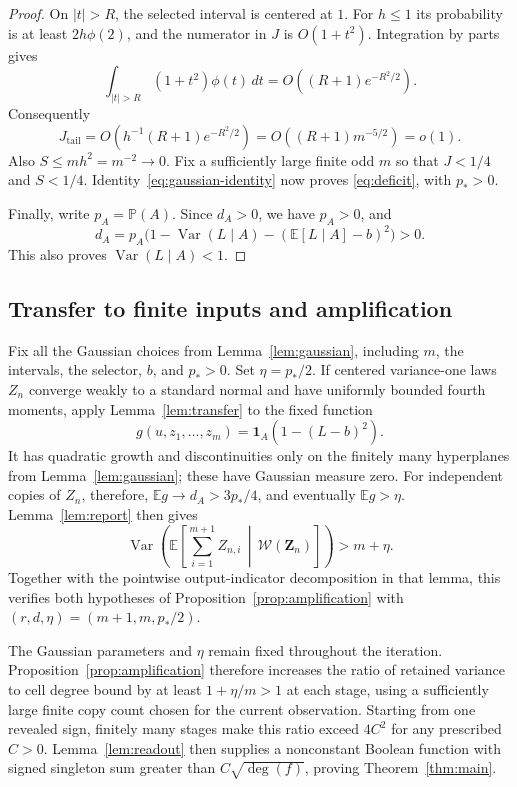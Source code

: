 \begin{proof}
On $|t|>R$, the selected interval is centered at $1$.  For $h\le1$
its probability is at least $2h\phi(2)$, and the numerator in $J$
is $O(1+t^2)$.  Integration by parts gives
\[
 \int_{|t|>R}(1+t^2)\phi(t)\,dt
       =O((R+1)e^{-R^2/2}).
\]
Consequently
\[
 J_{\mathrm{tail}}
 =O(h^{-1}(R+1)e^{-R^2/2})
 =O((R+1)m^{-5/2})=o(1).
\]
Also $S\le mh^2=m^{-2}\to0$.  Fix a sufficiently large finite odd
$m$ so that $J<1/4$ and $S<1/4$.  Identity~\eqref{eq:gaussian-identity}
now proves \eqref{eq:deficit}, with $p_*>0$.

Finally, write $p_A=\mathbb P(A)$.  Since $d_A>0$, we have $p_A>0$,
and
\[
 d_A=p_A\bigl(1-\operatorname{Var}(L\mid A)
                   -(\mathbb E[L\mid A]-b)^2\bigr)>0.
\]
This also proves $\operatorname{Var}(L\mid A)<1$.
\end{proof}

\subsection{Transfer to finite inputs and amplification}

Fix all the Gaussian choices from Lemma~\ref{lem:gaussian},
including $m$, the intervals, the selector, $b$, and $p_*>0$.
Set $\eta=p_*/2$.  If centered variance-one laws $Z_n$ converge
weakly to a standard normal and have uniformly bounded fourth moments,
apply Lemma~\ref{lem:transfer} to the fixed function
\[
 g(u,z_1,\ldots,z_m)=\mathbf1_A(1-(L-b)^2).
\]
It has quadratic growth and discontinuities only on the finitely many
hyperplanes from Lemma~\ref{lem:gaussian}; these have Gaussian
measure zero.  For independent copies of $Z_n$, therefore,
$\mathbb Eg\to d_A>3p_*/4$, and eventually $\mathbb Eg>\eta$.
Lemma~\ref{lem:report} then gives
\[
 \operatorname{Var}\!\left(
   \mathbb E\!\left[\sum_{i=1}^{m+1} Z_{n,i}
                   \,\middle|\,\mathcal W(\mathbf Z_n)\right]\right)
 >m+\eta.
\]
Together with the pointwise output-indicator decomposition in that
lemma, this verifies both hypotheses of
Proposition~\ref{prop:amplification} with
$(r,d,\eta)=(m+1,m,p_*/2)$.

The Gaussian parameters and $\eta$ remain fixed throughout the iteration.
Proposition~\ref{prop:amplification} therefore increases the ratio of
retained variance to cell degree bound by at least $1+\eta/m>1$ at
each stage, using a sufficiently large finite copy count chosen for the
current observation. Starting from one revealed sign, finitely many
stages make this ratio exceed $4C^2$ for any prescribed $C>0$.
Lemma~\ref{lem:readout} then supplies a nonconstant Boolean function
with signed singleton sum greater than $C\sqrt{\deg(f)}$, proving
Theorem~\ref{thm:main}.
